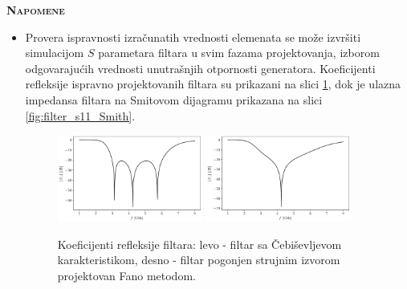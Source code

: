 \documentclass[a4paper]{article}
\begin{document}
\begin{center}
\large{\textbf{\textsc{Napomene}}}
\end{center}

\begin{itemize}
\item Provera ispravnosti izračunatih vrednosti elemenata se može izvršiti simulacijom $S$ parametara filtara u svim fazama projektovanja, izborom odgovarajućih vrednosti unutrašnjih otpornosti generatora.
Koeficijenti refleksije ispravno projektovanih filtara su prikazani na slici \ref{fig:filter_s11_dB}, dok je ulazna impedansa filtara na Smitovom dijagramu prikazana na slici \ref{fig:filter_s11_Smith}.

\begin{figure}[!h]
\begin{center}
\includegraphics[width=0.45\textwidth]{fig/cheby3_s11.pdf}
\hspace{5mm}
\includegraphics[width=0.45\textwidth]{fig/fano3_s11.pdf}
\caption{Koeficijenti refleksije filtara: levo - filtar sa Čebiševljevom karakteristikom, desno - filtar  pogonjen strujnim izvorom projektovan Fano metodom.}
\label{fig:filter_s11_dB}
\end{center}
\end{figure}


\end{itemize}
\end{document}
